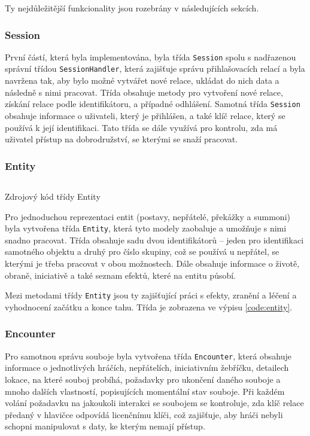 Ty nejdůležitější funkcionality jsou rozebrány v následujících sekcích.

\subsubsection*{Session}
\label{subsubsec:impl_session}

První částí, která byla implementována, byla třída \texttt{Session} spolu s nadřazenou správní třídou \texttt{SessionHandler}, která zajišťuje správu přihlašovacích relací a byla navržena tak, aby bylo možné vytvářet nové relace, ukládat do nich data a následně s nimi pracovat. Třída obsahuje metody pro vytvoření nové relace, získání relace podle identifikátoru, a případné odhlášení. Samotná třída \texttt{Session} obsahuje informace o uživateli, který je přihlášen, a také klíč relace, který se používá k její identifikaci. Tato třída se dále využívá pro kontrolu, zda má uživatel přístup na dobrodružství, se kterými se snaží pracovat.

\subsubsection*{Entity}
\label{subsubsec:impl_entity}

\begin{listing}[H]
    \inputminted{Java}{code/EncounterEntity.java}
    \caption{Zdrojový kód třídy Entity}
    \label{code:entity}
\end{listing}

Pro jednoduchou reprezentaci entit (postavy, nepřátelé, překážky a summoni) byla vytvořena třída \texttt{Entity}, která tyto modely zaobaluje a umožňuje s nimi snadno pracovat. Třída obsahuje sadu dvou identifikátorů -- jeden pro identifikaci samotného objektu a druhý pro číslo skupiny, což se používá u nepřátel, se kterými je třeba pracovat v obou možnostech. Dále obsahuje informace o životě, obraně, iniciativě a také seznam efektů, které na entitu působí.

Mezi metodami třídy \texttt{Entity} jsou ty zajišťující práci s efekty, zranění a léčení a vyhodnocení začátku a konce tahu. Třída je zobrazena ve výpisu \ref{code:entity}.

\subsubsection*{Encounter}
\label{subsubsec:impl_encounter}

Pro samotnou správu souboje byla vytvořena třída \texttt{Encounter}, která obsahuje informace o jednotlivých hráčích, nepřátelích, iniciativním žebříčku, detailech lokace, na které souboj probíhá, požadavky pro ukončení daného souboje a mnoho dalších vlastností, popisujících momentální stav souboje. Při každém volání požadavku na jakoukoli interakci se soubojem se kontroluje, zda klíč relace předaný v hlavičce odpovídá licenčnímu klíči, což zajišťuje, aby hráči nebyli schopni manipulovat s daty, ke kterým nemají přístup.

